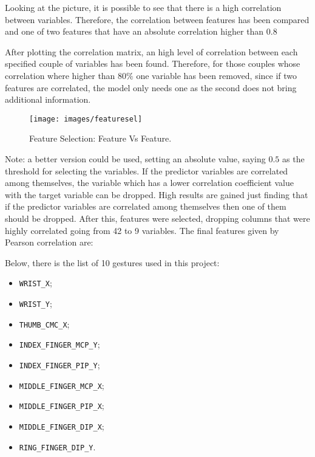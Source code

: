 \noindent Looking at the picture, it is possible to see that there is a high correlation between variables. Therefore, the correlation between features has been compared and one of two features that have an absolute correlation higher than $0.8$

\noindent After plotting the correlation matrix, an high level of correlation between each specified couple of variables has been found. Therefore, for those couples whose correlation where higher than $80\%$ one variable has been removed, since if two features are correlated, the model only needs one as the second does not bring additional information. 

\begin{figure}[H]
	\centering
	\texttt{[image: images/featuresel]}
	\caption[Feature Selection: Feature Vs Feature.]{Feature Selection: Feature Vs Feature.}
	\label{fig:featuresel}
\end{figure}

\noindent Note: a better version could be used, setting an absolute value, saying $0.5$ as the threshold for selecting the variables. If the predictor variables are correlated among themselves, the variable which has a lower correlation coefficient value with the target variable can be dropped. High results are gained just finding that if the predictor variables are correlated among themselves then one of them should be dropped. After this, features were selected, dropping columns that were highly correlated going from 42 to 9 variables. The final features given by Pearson correlation are: 

\noindent Below, there is the list of 10 gestures used in this project:
\begin{itemize}
	\item \texttt{WRIST\_X};
	\item \texttt{WRIST\_Y};
	\item \texttt{THUMB\_CMC\_X};
	\item \texttt{INDEX\_FINGER\_MCP\_Y};
	\item \texttt{INDEX\_FINGER\_PIP\_Y};
	\item \texttt{MIDDLE\_FINGER\_MCP\_X};
	\item \texttt{MIDDLE\_FINGER\_PIP\_X};
	\item \texttt{MIDDLE\_FINGER\_DIP\_X};
	\item \texttt{RING\_FINGER\_DIP\_Y}.
\end{itemize}

